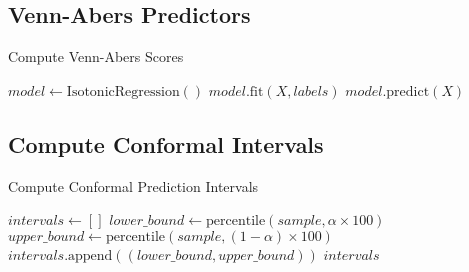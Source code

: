 \documentclass{article}
\begin{document}
\subsection*{Venn-Abers Predictors}
\begin{algorithm}
\caption{Compute Venn-Abers Scores}
\begin{algorithmic}[1]
    \State $model \gets \text{IsotonicRegression}()$
    \State $model.\text{fit}(X, labels)$
    \State \Return $model.\text{predict}(X)$
\EndFunction
\end{algorithmic}
\end{algorithm}

\subsection*{Compute Conformal Intervals}
\begin{algorithm}
\caption{Compute Conformal Prediction Intervals}
\begin{algorithmic}[1]
    \State $intervals \gets []$
        \State $lower\_bound \gets \text{percentile}(sample, \alpha \times 100)$
        \State $upper\_bound \gets \text{percentile}(sample, (1 - \alpha) \times 100)$
        \State $intervals.\text{append}((lower\_bound, upper\_bound))$
    \EndFor
    \State \Return $intervals$
\EndFunction
\end{algorithmic}
\end{algorithm}
\end{document}
